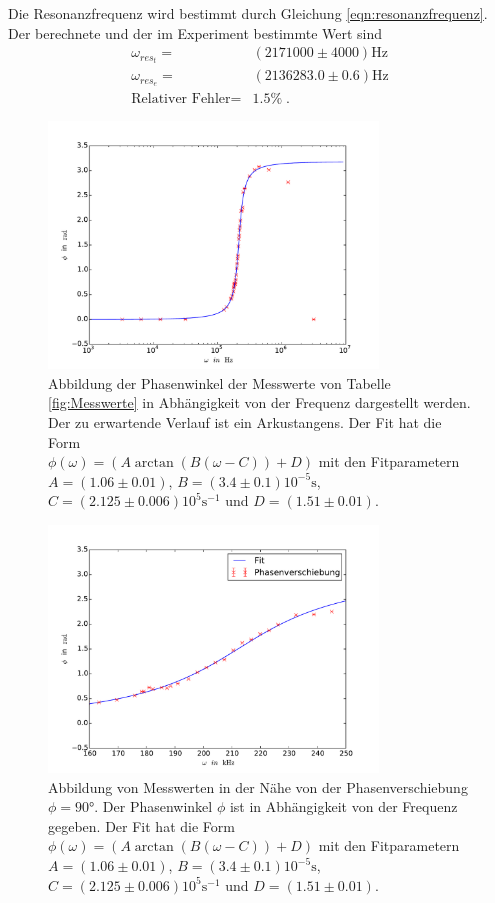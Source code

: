 Die Resonanzfrequenz wird bestimmt durch Gleichung \eqref{eqn:resonanzfrequenz}.
Der berechnete und der im Experiment bestimmte Wert sind
\begin{align*}
\omega_{res_t}=&(2171000\pm4000)\si{\hertz}\\
\omega_{res_e}=&(2136283.0\pm0.6)\si{\hertz}\\
\text{Relativer Fehler}=&1.5\%\;.
\end{align*}
\begin{figure}
  \centering
  \includegraphics[width=0.78\textwidth]{phasenverschiebung.pdf}
  \caption{Abbildung der Phasenwinkel der Messwerte von Tabelle \ref{fig:Messwerte} in
  Abhängigkeit von der Frequenz dargestellt werden. Der zu erwartende Verlauf ist
  ein Arkustangens. Der Fit hat die Form\\
    $\phi(\omega)=(A\arctan(B(\omega-C))+D)$
    mit den Fitparametern\\
    $A=(1.06\pm0.01)$, $B=(3.4\pm0.1)10^{-5}\si{\second}$,
    $C=(2.125\pm0.006)10^{5}\si{\second}^{-1}$ und $D=(1.51\pm0.01)$\;.}
  \label{fig:phasenverschiebung}
\end{figure}
\begin{figure}
  \centering
  \includegraphics[width=0.78\textwidth]{linphasenverschiebung.pdf}
  \caption{Abbildung von Messwerten in der Nähe von der Phasenverschiebung $\phi=90°$.
          Der Phasenwinkel $\phi$ ist in Abhängigkeit von der Frequenz gegeben.
          Der Fit hat die Form
            $\phi(\omega)=(A\arctan(B(\omega-C))+D)$
            mit den Fitparametern
            $A=(1.06\pm0.01)$, $B=(3.4\pm0.1)10^{-5}\si{\second}$,
            $C=(2.125\pm0.006)10^{5}\si{\second}^{-1}$ und $D=(1.51\pm0.01)$\;.}
  \label{fig:linphasenverschiebung}
\end{figure}
